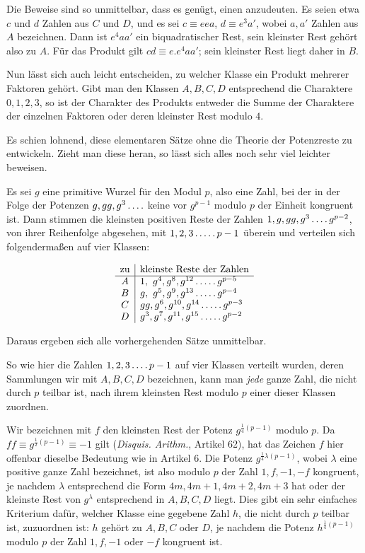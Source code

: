 Die Beweise sind so unmittelbar, dass es genügt, einen anzudeuten. Es seien etwa $c$ und $d$ Zahlen aus $C$ und $D$, und es sei $c\equiv eea$, $d\equiv e^3a'$, wobei $a,a'$ Zahlen aus $A$ bezeichnen. Dann ist $e^4aa'$ ein biquadratischer Rest, sein kleinster Rest gehört also zu $A$. Für das Produkt gilt $cd$\relax$\equiv e.e^4aa'$; sein kleinster Rest liegt daher in $B$.

Nun lässt sich auch leicht entscheiden, zu welcher Klasse ein Produkt mehrerer Faktoren gehört. Gibt man den Klassen $A,B,C,D$ entsprechend die Charaktere $0,1,2,3$, so ist der Charakter des Produkts entweder die Summe der Charaktere der einzelnen Faktoren oder deren kleinster Rest modulo $4$.

Es schien lohnend, diese elementaren Sätze ohne die Theorie der Potenzreste zu entwickeln. Zieht man diese heran, so lässt sich alles noch sehr viel leichter beweisen.

Es sei $g$ eine primitive Wurzel für den Modul $p$, also eine Zahl, bei der in der Folge der Potenzen $g,gg,g^3\mathinner{.\,.\,.\,.}$ keine vor $g^{p-1}$ modulo $p$ der Einheit kongruent ist. Dann stimmen die kleinsten positiven Reste der Zahlen $1,g,gg,g^3\mathinner{.\,.\,.\,.} g^{p-2}$, von ihrer Reihenfolge abgesehen, mit $1,2,3\mathinner{.\,.\,.\,.\,.} p-1$ überein und verteilen sich folgendermaßen auf vier Klassen:

%
\[
\begin{array}{c|l}
\text{zu}&\text{kleinste Reste der Zahlen}\\\hline
A&1,\ g^4,g^8,g^{12}\mathinner{.\,.\,.\,.\,.} g^{p-5}\\
B&g,\ g^5,g^9,g^{13}\mathinner{.\,.\,.\,.\,.} g^{p-4}\\
C&gg,g^6,g^{10},g^{14}\mathinner{.\,.\,.\,.\,.} g^{p-3}\\
D&g^3,g^7,g^{11},g^{15}\mathinner{.\,.\,.\,.\,.} g^{p-2}
\end{array}
\]

Daraus ergeben sich alle vorhergehenden Sätze unmittelbar.

So wie hier die Zahlen $1,2,3\mathinner{.\,.\,.\,.} p-1$ auf vier Klassen verteilt wurden, deren Sammlungen wir mit $A,B,C,D$ bezeichnen, kann man \emph{jede} ganze Zahl, die nicht durch $p$ teilbar ist, nach ihrem kleinsten Rest modulo $p$ einer dieser Klassen zuordnen.

Wir bezeichnen mit $f$ den kleinsten Rest der Potenz $g^{\frac14(p-1)}$ modulo $p$. Da $ff\equiv g^{\frac12(p-1)}\equiv-1$ gilt (\emph{Disquis. Arithm.}, Artikel 62), hat das Zeichen $f$ hier offenbar dieselbe Bedeutung wie in Artikel 6. Die Potenz $g^{\frac14\lambda(p-1)}$, wobei $\lambda$ eine positive ganze Zahl bezeichnet, ist also modulo $p$ der Zahl $1,f,-1,-f$ kongruent, je nachdem $\lambda$ entsprechend die Form $4m,4m+1,4m+2,4m+3$ hat oder der kleinste Rest von $g^\lambda$ entsprechend in $A,B,C,D$ liegt. Dies gibt ein sehr einfaches Kriterium dafür, welcher Klasse eine gegebene Zahl $h$, die nicht durch $p$ teilbar ist, zuzuordnen ist: $h$ gehört zu $A,B,C$ oder $D$, je nachdem die Potenz $h^{\frac14(p-1)}$ modulo $p$ der Zahl $1,f,-1$ oder $-f$ kongruent ist.

